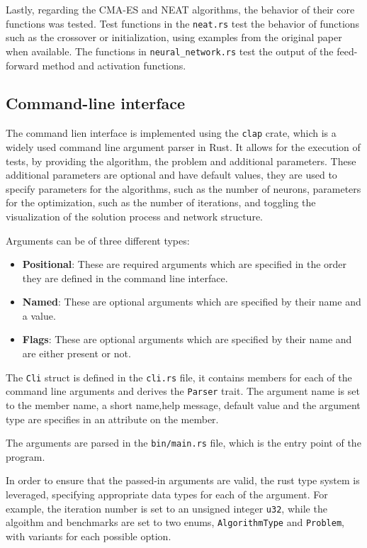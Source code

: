 Lastly, regarding the CMA-ES and NEAT algorithms, the behavior of their core functions was tested. Test functions in the \texttt{neat.rs} test the
behavior of functions such as the crossover or initialization, using examples from the original paper \cite{neat} when available. The functions in
\texttt{neural\_network.rs} test the output of the feed-forward method and activation functions.

\subsection{Command-line interface}

The command lien interface is implemented using the \texttt{clap} crate, which is a widely used command line argument parser in Rust.
It allows for the execution of tests, by providing the algorithm, the problem and additional parameters. These additional parameters are optional and have
default values, they are used to specify parameters for the algorithms, such as the number of neurons, parameters for the optimization, such as the number of
iterations, and toggling the visualization of the solution process and network structure.

Arguments can be of three different types:

\begin{itemize}
    \item \textbf{Positional}: These are required arguments which are specified in the order they are defined in the command line interface.
    \item \textbf{Named}: These are optional arguments which are specified by their name and a value.
    \item \textbf{Flags}: These are optional arguments which are specified by their name and are either present or not.
\end{itemize}

The \texttt{Cli} struct is defined in the \texttt{cli.rs} file, it contains members for each of the command line arguments and derives the \texttt{Parser} trait.
The argument name is set to the member name, a short name,help message, default value and the argument type are specifies in an attribute on the member.

The arguments are parsed in the \texttt{bin/main.rs} file, which is the entry point of the program.

In order to ensure that the passed-in arguments are valid, the rust type system is leveraged, specifying appropriate data types for each of the argument.
For example, the iteration number is set to an unsigned integer \texttt{u32}, while the algoithm and benchmarks are set to two enums, \texttt{AlgorithmType} and
\texttt{Problem}, with variants for each possible option.

